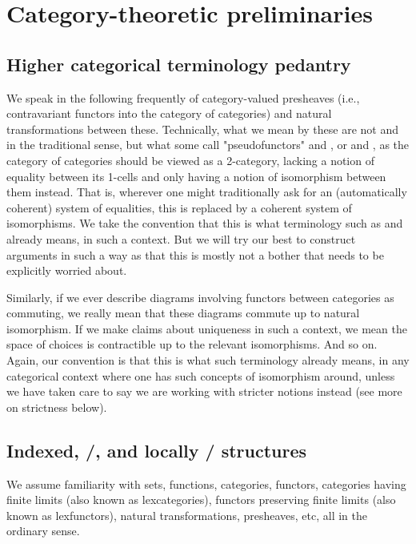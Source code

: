 \section{Category-theoretic preliminaries}

\subsection{Higher categorical terminology pedantry}
We speak in the following frequently of category-valued presheaves (i.e., contravariant functors into the category of categories) and natural transformations between these. Technically, what we mean by these are not  and  in the traditional sense, but what some call "pseudofunctors" and , or  and , as the category of categories should be viewed as a 2-category, lacking a notion of equality between its 1-cells and only having a notion of isomorphism between them instead. That is, wherever one might traditionally ask for an (automatically coherent) system of equalities, this is replaced by a coherent system of isomorphisms. We take the convention that this is what terminology such as  and  already means, in such a context. But we will try our best to construct arguments in such a way as that this is mostly not a bother that needs to be explicitly worried about.

Similarly, if we ever describe diagrams involving functors between categories as commuting, we really mean that these diagrams commute up to natural isomorphism. If we make claims about uniqueness in such a context, we mean the space of choices is contractible up to the relevant isomorphisms. And so on. Again, our convention is that this is what such terminology already means, in any categorical context where one has such concepts of isomorphism around, unless we have taken care to say we are working with stricter notions instead (see more on strictness below).

\subsection{Indexed, \repsmall/, and locally \repsmall/ structures}
We assume familiarity with sets, functions, categories, functors, categories having finite limits (also known as lexcategories), functors preserving finite limits (also known as lexfunctors), natural transformations, presheaves, etc, all in the ordinary sense.


